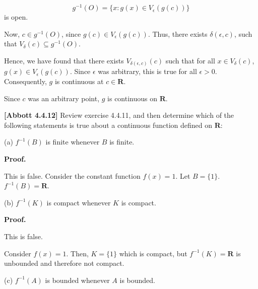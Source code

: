 \documentclass[10pt]{article}
\begin{document}
\begin{equation*}
g^{-1}( O) =\{x:g( x) \in V_{\epsilon }( g( c))\}
\end{equation*}
is open. 



Now, $\displaystyle c\in g^{-1}( O)$, since $\displaystyle g( c) \in V_{\epsilon }( g( c))$. Thus, there exists $\displaystyle \delta ( \epsilon ,c)$, such that $\displaystyle V_{\delta }( c) \subseteq g^{-1}( O)$. 



Hence, we have found that there exists $\displaystyle V_{\delta ( \epsilon ,c)}( c)$ such that for all $\displaystyle x\in V_{\delta }( c)$, $\displaystyle g( x) \in V_{\epsilon }( g( c))$. Since $\displaystyle \epsilon $ was arbitrary, this is true for all $\displaystyle \epsilon  >0$. Consequently, $\displaystyle g$ is continuous at $\displaystyle c\in \mathbf{R}$.



Since $\displaystyle c$ was an arbitrary point, $\displaystyle g$ is continuous on $\displaystyle \mathbf{R}$.



\textbf{[Abbott 4.4.12]} Review exercise 4.4.11, and then determine which of the following statements is true about a continuous function defined on $\displaystyle \mathbf{R}$:



(a) $\displaystyle f^{-1}( B)$ is finite whenever $\displaystyle B$ is finite.



\textbf{Proof.}

 

This is false. Consider the constant function $\displaystyle f( x) =1$. Let $\displaystyle B=\{1\}$. $\displaystyle f^{-1}( B) =\mathbf{R}$.



(b) $\displaystyle f^{-1}( K)$ is compact whenever $\displaystyle K$ is compact.



\textbf{Proof.}



This is false. 



Consider $\displaystyle f( x) =1$. Then, $\displaystyle K=\{1\}$ which is compact, but $\displaystyle f^{-1}( K) =\mathbf{R}$ is unbounded and therefore not compact.



(c) $\displaystyle f^{-1}( A)$ is bounded whenever $\displaystyle A$ is bounded.
\end{document}
